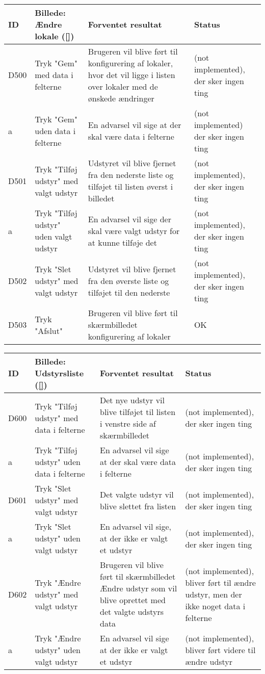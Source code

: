 \begin{longtable}{ |p{0.85cm}| p{7cm} | p{7.15cm} | p{1cm} | }
\hline
ID & Billede: Ændre lokale (\ref{})  & Forventet resultat & Status\\ 
\hline
D500 & Tryk "Gem" med data i felterne & Brugeren vil blive ført til konfigurering af lokaler, hvor det vil ligge i listen over lokaler med de ønskede ændringer  & (not implemented), der sker ingen ting\\
\hline
a & Tryk "Gem" uden data i felterne & En advarsel vil sige at der skal være data i felterne &(not implemented) der sker ingen ting \\
\hline
D501 & Tryk "Tilføj udstyr" med valgt udstyr & Udstyret vil blive fjernet fra den nederste liste og tilføjet til listen øverst i billedet &(not implemented), der sker ingen ting \\
\hline
a & Tryk "Tilføj udstyr" uden valgt udstyr & En advarsel vil sige der skal være valgt udstyr for at kunne tilføje det &(not implemented), der sker ingen ting \\
\hline
D502 & Tryk "Slet udstyr" med valgt udstyr & Udstyret vil blive fjernet fra den øverste liste og tilføjet til den nederste  &(not implemented), der sker ingen ting \\
\hline
D503 & Tryk "Afslut" & Brugeren vil blive ført til skærmbilledet konfigurering af lokaler & OK\\
\hline
\end{longtable}

\begin{longtable}{ |p{0.85cm}| p{7cm} | p{7.15cm} | p{1cm} | }
\hline
ID & Billede: Udstyrsliste (\ref{})  & Forventet resultat & Status\\ 
\hline
D600 & Tryk "Tilføj udstyr" med data i felterne & Det nye udstyr vil blive tilføjet til listen i venstre side af skærmbilledet &(not implemented), der sker ingen ting \\
\hline
a & Tryk "Tilføj udstyr" uden data i felterne & En advarsel vil sige at der skal være data i felterne &(not implemented), der sker ingen ting \\
\hline
D601 & Tryk "Slet udstyr" med valgt udstyr & Det valgte udstyr vil blive slettet fra listen &(not implemented), der sker ingen ting \\
\hline
a & Tryk "Slet udstyr" uden valgt udstyr & En advarsel vil sige, at der ikke er valgt et udstyr &(not implemented), der sker ingen ting \\
\hline
D602 & Tryk "Ændre udstyr" med valgt udstyr & Brugeren vil blive ført til skærmbilledet Ændre udstyr som vil blive oprettet med det valgte udstyrs data &(not implemented), bliver ført til ændre udstyr, men der ikke noget data i felterne \\
\hline
a & Tryk "Ændre udstyr" uden valgt udstyr & En advarsel vil sige at der ikke er valgt et udstyr & (not implemented), bliver ført videre til ændre udstyr \\
\hline
\end{longtable}

